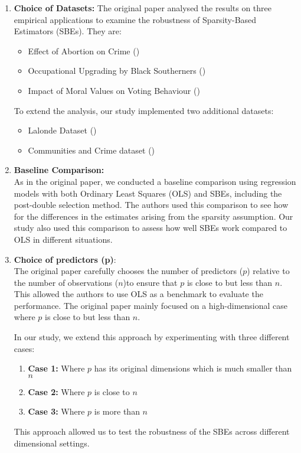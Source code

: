 \begin{enumerate}
    \item \textbf{Choice of Datasets:} 
    The original paper analysed the results on three empirical applications to examine the robustness of Sparsity-Based Estimators (SBEs). They are:
    \begin{itemize}
        \item Effect of Abortion on Crime (\cite{abortionCrime})
        \item Occupational Upgrading by Black Southerners (\cite{blackWW2})
        \item Impact of Moral Values on Voting Behaviour (\cite{votingMoral})
    \end{itemize}
    To extend the analysis, our study implemented two additional datasets:
    \begin{itemize}
        \item Lalonde Dataset (\cite{dowhy})
        \item Communities and Crime dataset (\cite{misc_communities_and_crime_unnormalized_211})
    \end{itemize}

    \item \textbf{Baseline Comparison:}\\
    As in the original paper, we conducted a baseline comparison using regression models with both Ordinary Least Squares (OLS) and SBEs, including the post-double selection method. The authors used this comparison to see how for the differences in the estimates arising from the sparsity assumption. Our study also used this comparison to assess how well SBEs work compared to OLS in different situations. 
    
    \item \textbf{Choice of predictors (p)}:\\
    The original paper carefully chooses the number of predictors ($p$) relative to the number of observations ($n$)to ensure that $p$ is close to but less than $n$. This allowed the authors to use OLS as a benchmark to evaluate the performance. The original paper mainly focused on a high-dimensional case where $p$ is close to but less than $n$. 

    In our study, we extend this approach by experimenting with three different cases:
    \begin{enumerate}
        \item \textbf{Case 1:} Where $p$ has its original dimensions which is much smaller than $n$
        \item \textbf{Case 2:} Where $p$ is close to $n$
        \item \textbf{Case 3:} Where $p$ is more than $n$
    \end{enumerate}
    This approach allowed us to test the robustness of the SBEs across different dimensional settings. 


\end{enumerate}
